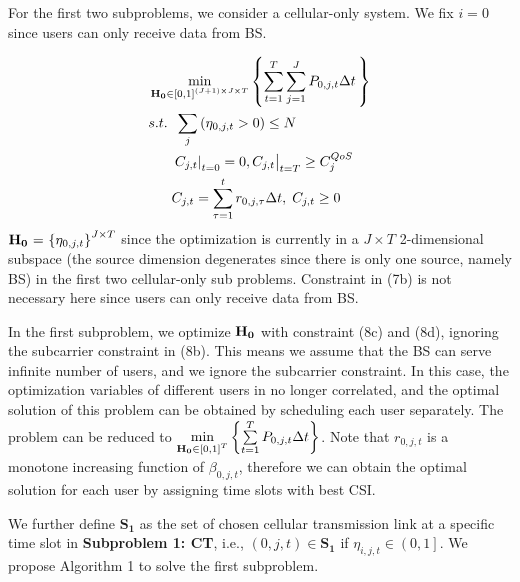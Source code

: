 \documentclass{ieeeaccess}
\begin{document}
For the first two subproblems, we consider a cellular-only system. We fix $i = 0$ since users can only receive data from BS.

\begin{subequations}
\begin{align}
& \mathop {\min }\limits_{{\mathbf{{\rm H}}}_{\mathbf{0}} \in {{\left[ {0,1} \right]}^{\left( {J + 1} \right) \times J \times T}}} \left\{ {\sum\limits_{t = 1}^T {\sum\limits_{j = 1}^J {{P_{0,j,t}}\Delta t} \,} } \right\} \\
& {s.t.} \;\; \sum\limits_j  {\left( {{\eta _{0,j,t}} > 0} \right)}   \le N \\
& \;\;\;\;\;\; {\left. {{{\left. {{C_{j,t}}} \right|}_{t = 0}} = 0, {C_{j,t}}} \right|_{t = T}} \ge C_j^{QoS} \\
& \;\;\;\;\;\; {C_{j,t}} = \sum\limits_{\tau  = 1}^t {{r_{0,j,\tau }}\Delta t} ,\; {C_{j,t}} \ge 0
\end{align}
\end{subequations}
${{\mathbf{{\rm H}}}_{\mathbf{0}}}{\text{ = }}{\left\{ {{\eta _{0,j,t}}} \right\}^{J \times T}}$ since the optimization is currently in a $J \times T$ 2-dimensional subspace (the source dimension degenerates since there is only one source, namely BS) in the first two cellular-only sub problems. Constraint in (7b) is not necessary here since users can only receive data from BS.

In the first subproblem, we optimize ${{\mathbf{{\rm H}}}_{\mathbf{0}}}$ with constraint (8c) and (8d), ignoring the subcarrier constraint in (8b). This means we assume that the BS can serve infinite number of users, and we ignore the subcarrier constraint. In this case, the optimization variables of different users in no longer correlated, and the optimal solution of this problem can be obtained by scheduling each user separately. The problem can be reduced to $\mathop {\min }\limits_{{{\mathbf{{\rm H}}}_{\mathbf{0}}} \in {{\left[ {0,1} \right]}^T}} \left\{ {\sum\limits_{t = 1}^T {{P_{0,j,t}}\Delta t} } \right\}$. Note that ${r_{0,j,t}}$ is a monotone increasing function of ${\beta _{0,j,t}}$, therefore we can obtain the optimal solution for each user by assigning time slots with best CSI. 

We further define ${{\mathbf{S}}_{\mathbf{1}}}$ as the set of chosen cellular transmission link at a specific time slot in \textbf{Subproblem 1: CT}, i.e., $\left( {0,j,t} \right) \in {\mathbf{S}}_{\mathbf{1}}$ if ${\eta _{i,j,t}} \in \left( {0,1} \right]$. We propose Algorithm 1 to solve the first subproblem.
\end{document}
